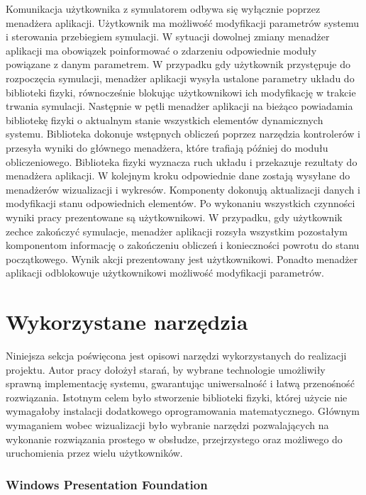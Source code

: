 \documentclass[12pt, oneside]{report}
\theoremstyle{definition}
\begin{document}
Komunikacja użytkownika z symulatorem odbywa się wyłącznie poprzez menadżera aplikacji. Użytkownik ma możliwość modyfikacji parametrów systemu i sterowania przebiegiem symulacji. W sytuacji dowolnej zmiany menadżer aplikacji ma obowiązek poinformować o zdarzeniu odpowiednie moduły powiązane z danym parametrem. W przypadku gdy użytkownik przystępuje do rozpoczęcia symulacji, menadżer aplikacji wysyła ustalone parametry układu do biblioteki fizyki, równocześnie blokując użytkownikowi ich modyfikację w trakcie trwania symulacji. Następnie w pętli menadżer aplikacji na bieżąco powiadamia bibliotekę fizyki o aktualnym stanie wszystkich elementów dynamicznych systemu. Biblioteka dokonuje wstępnych obliczeń poprzez narzędzia kontrolerów i przesyła wyniki do głównego menadżera, które trafiają później do modułu obliczeniowego. Biblioteka fizyki wyznacza ruch układu i przekazuje rezultaty do menadżera aplikacji. W kolejnym kroku odpowiednie dane zostają wysyłane do menadżerów wizualizacji i wykresów. Komponenty dokonują aktualizacji danych i modyfikacji stanu odpowiednich elementów. Po wykonaniu wszystkich czynności wyniki pracy prezentowane są użytkownikowi. W przypadku, gdy użytkownik zechce zakończyć symulacje, menadżer aplikacji rozsyła wszystkim pozostałym komponentom informację o zakończeniu obliczeń i konieczności powrotu do stanu początkowego. Wynik akcji prezentowany jest użytkownikowi. Ponadto menadżer aplikacji odblokowuje użytkownikowi możliwość modyfikacji parametrów.

\section{Wykorzystane narzędzia}
\label{Tools}
Niniejsza sekcja poświęcona jest opisowi narzędzi wykorzystanych do realizacji projektu. Autor pracy dołożył starań, by wybrane technologie umożliwiły sprawną implementację systemu, gwarantując uniwersalność i łatwą przenośność rozwiązania. Istotnym  celem było stworzenie biblioteki fizyki, której użycie nie wymagałoby instalacji dodatkowego oprogramowania matematycznego. Głównym wymaganiem wobec wizualizacji było wybranie narzędzi pozwalających na wykonanie rozwiązania prostego w obsłudze, przejrzystego oraz możliwego do uruchomienia przez wielu użytkowników.

\subsubsection{Windows Presentation Foundation}
\end{document}
